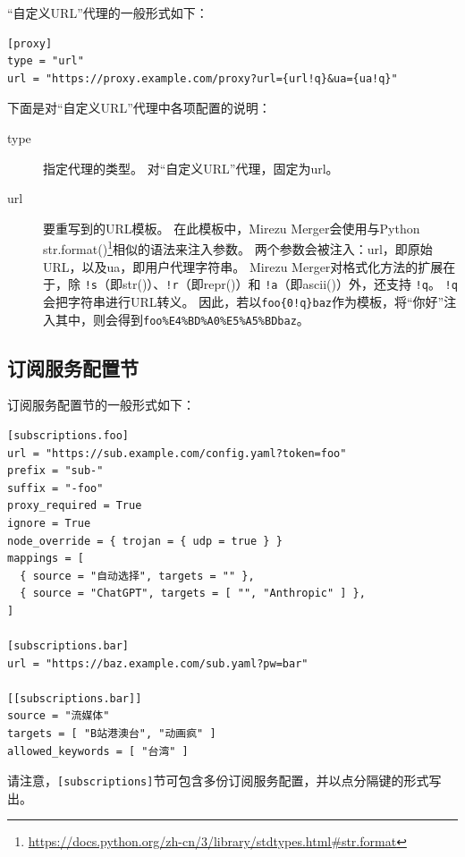 \documentclass[a4paper,fontset=founder,punct=kaiming]{ctexart}
\renewcommand\_{\textunderscore\linebreak[1]}
\newcommand{\productname}{Mirezu Merger}
\begin{document}
“自定义URL”代理的一般形式如下：
\begin{Verbatim}
[proxy]
type = "url"
url = "https://proxy.example.com/proxy?url={url!q}&ua={ua!q}"
\end{Verbatim}

下面是对“自定义URL”代理中各项配置的说明：
\begin{description}
\item[type] 指定代理的类型。
  对“自定义URL”代理，固定为url。
\item[url] 要重写到的URL模板。
  在此模板中，\productname 会使用与Python str.format()\footnote{\url{https://docs.python.org/zh-cn/3/library/stdtypes.html\#str.format}}相似的语法来注入参数。
  两个参数会被注入：url，即原始URL，以及ua，即用户代理字符串。
  \productname 对格式化方法的扩展在于，除 \texttt{!s}（即str()）、\texttt{!r}（即repr()）和 \texttt{!a}（即ascii()）外，还支持 \texttt{!q}。
  \texttt{!q}会把字符串进行URL转义。
  因此，若以\Verb|foo{0!q}baz|作为模板，将“你好”注入其中，则会得到\texttt{foo\%E4\%BD\%A0\%E5\%A5\%BDbaz}。
\end{description}

\subsection{订阅服务配置节}
\label{sec:subconf}

订阅服务配置节的一般形式如下：
\begin{Verbatim}
[subscriptions.foo]
url = "https://sub.example.com/config.yaml?token=foo"
prefix = "sub-"
suffix = "-foo"
proxy_required = True
ignore = True
node_override = { trojan = { udp = true } }
mappings = [
  { source = "自动选择", targets = "" },
  { source = "ChatGPT", targets = [ "", "Anthropic" ] },
]

[subscriptions.bar]
url = "https://baz.example.com/sub.yaml?pw=bar"

[[subscriptions.bar]]
source = "流媒体"
targets = [ "B站港澳台", "动画疯" ]
allowed_keywords = [ "台湾" ]
\end{Verbatim}
请注意，\texttt{[subscriptions]}节可包含多份订阅服务配置，并以点分隔键的形式写出。
\end{document}
